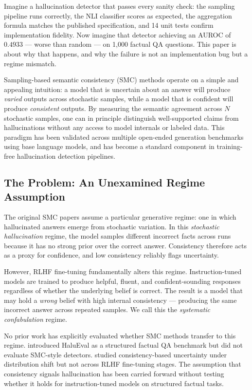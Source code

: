 Imagine a hallucination detector that passes every sanity check: the sampling pipeline runs correctly, the NLI classifier scores as expected, the aggregation formula matches the published specification, and 14 unit tests confirm implementation fidelity. Now imagine that detector achieving an AUROC of $0.4933$ --- worse than random --- on 1,000 factual QA questions. This paper is about why that happens, and why the failure is not an implementation bug but a regime mismatch.

Sampling-based semantic consistency (SMC) methods \cite{Kuhn2023Semantic,Manakul2023SelfCheckGPT} operate on a simple and appealing intuition: a model that is uncertain about an answer will produce \emph{varied} outputs across stochastic samples, while a model that is confident will produce \emph{consistent} outputs. By measuring the semantic agreement across $N$ stochastic samples, one can in principle distinguish well-supported claims from hallucinations without any access to model internals or labeled data. This paradigm has been validated across multiple open-ended generation benchmarks using base language models, and has become a standard component in training-free hallucination detection pipelines.

\subsection{The Problem: An Unexamined Regime Assumption}

The original SMC papers \cite{Kuhn2023Semantic,Manakul2023SelfCheckGPT} assume a particular generative regime: one in which hallucinated answers emerge from stochastic variation. In this \emph{stochastic hallucination} regime, the model samples different incorrect facts across runs because it has no strong prior over the correct answer. Consistency therefore acts as a proxy for confidence, and low consistency reliably flags uncertainty.

However, RLHF fine-tuning \cite{Ouyang2022Training,Bai2022Training} fundamentally alters this regime. Instruction-tuned models are trained to produce helpful, fluent, and confident-sounding responses regardless of whether the underlying belief is correct. The result is a model that may hold a \emph{wrong} belief with high internal consistency --- producing the same incorrect answer across repeated samples. We call this the \emph{systematic confabulation} regime.

No prior work has explicitly evaluated whether SMC methods transfer to this regime. \cite{Li2023HaluEval} introduced HaluEval as a structured factual QA benchmark but did not evaluate SMC-style detectors. \cite{Lin2024Generating} studied consistency-based uncertainty under distribution shift but not across RLHF fine-tuning stages. The assumption that consistency signals hallucination has been carried forward without testing whether it holds for instruction-tuned models on structured factual tasks.

